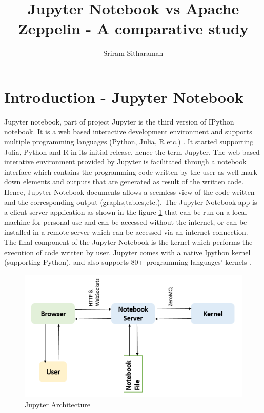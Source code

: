 \documentclass[9pt,twocolumn,twoside]{ ../../styles/osajnl}
\title{Jupyter Notebook vs Apache Zeppelin - A comparative study}
\author[1,*]{Sriram Sitharaman}
\affil[1]{School of Informatics and Computing, Bloomington, IN 47408, U.S.A.}
\affil[*]{Corresponding authors: srirsith@iu.edu}
\begin{document}
\maketitle
\tableofcontents %
\section{Introduction - Jupyter Notebook}
Jupyter notebook, part of project Jupyter is the third version of IPython notebook. It is a web based interactive development environment and supports multiple programming languages (Python, Julia, R etc.) \cite{www-jupyter-wiki}. It started supporting Julia, Python and R in its initial release, hence the term Jupyter. The web based interative environment provided by Jupyter is facilitated through a notebook interface which contains the programming code written by the user as well mark down elements and outputs that are generated as result of the written code\cite{www-jupyter-notebook}. Hence, Jupyter Notebook documents allows a seemless view of the code written and the corresponding output (graphs,tables,etc.). The Jupyter Notebook app is a client-server application as shown in the figure \ref{fig:arch} that can be run on a local machine for personal use and can be accessed without the internet, or can be installed in a remote server which can be accessed via an internet connection. The final component of the Jupyter Notebook is the kernel which performs the execution of code written by user. Jupyter comes with a native Ipython kernel (supporting Python), and also supports 80+ programming languages' kernels \cite{www-jupyter-kernel}.
\begin{figure}[h]
\begin{center}
\includegraphics[width =\linewidth,height=2.5in]{images/JupyterNotebook}
\caption{Jupyter Architecture \cite{www-jupyter-arch}}
\label{fig:arch}
\end{center}
\end{figure}
\end{document}

